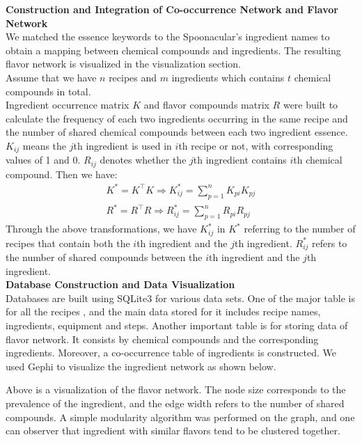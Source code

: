 \documentclass[sigconf]{acmart}
\begin{document}
\noindent
\textbf{Construction and Integration of Co-occurrence Network and Flavor Network}\\
We matched the essence keywords to the Spoonacular's ingredient names to obtain a mapping between chemical compounds and ingredients. The resulting flavor network is visualized in the visualization section.\\
\indent Assume that we have $n$ recipes and $m$ ingredients which contains $t$ chemical compounds in total. \\
\indent Ingredient occurrence matrix $K$ and flavor compounds matrix $R$ were built to calculate the frequency of each two ingredients occurring in the same recipe and the number of shared chemical compounds between each two ingredient essence. $K_{ij}$ means the $j$th ingredient is used in $i$th recipe or not, with corresponding values of 1 and 0. $R_{ij}$ denotes whether the $j$th ingredient contains $i$th chemical compound. Then we have:
\begin{align*}
K^*=K^\top K \Longrightarrow K^*_{ij}=\sum_{p=1}^n K_{pi}K_{pj} \\
R^*=R^\top R \Longrightarrow R^*_{ij}=\sum_{p=1}^n R_{pi}R_{pj}
\end{align*}
Through the above transformations, we have $K^*_{ij}$ in $K^*$ referring to the number of recipes that contain both the $i$th ingredient and the $j$th ingredient. $R^*_{ij}$ refers to the number of shared compounds between the $i$th ingredient and the $j$th ingredient. \\

\noindent
\textbf{Database Construction and Data Visualization}\\
Databases are built using SQLite3 for various data sets. One of the major table is for all the recipes , and the main data stored for it includes recipe names, ingredients, equipment and steps. Another important table is for storing data of flavor network. It consists by chemical compounds and the corresponding ingredients. Moreover, a co-occurrence table of ingredients is constructed. We used Gephi to visualize the ingredient network as shown below.\\
\begin{center}
\end{center}
Above is a visualization of the flavor network. The node size corresponds to the prevalence of the ingredient, and the edge width refers to the number of shared compounds. A simple modularity algorithm was performed on the graph, and one can observer that ingredient with similar flavors tend to be clustered together.\\
\end{document}
